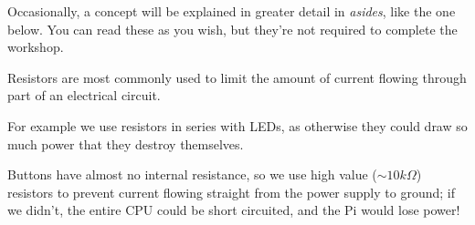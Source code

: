Occasionally, a concept will be explained in greater detail in \textit{asides}, like the one below. You can read these as you wish, but they're not required to complete the workshop.
	
\begin{aside}[Resistors]
	Resistors are most commonly used to limit the amount of current flowing through part of an electrical circuit.
	
	For example we use resistors in series with LEDs, as otherwise they could draw so much power that they destroy themselves.
	
	Buttons have almost no internal resistance, so we use high value ($\sim 10  k\Omega$) resistors to prevent current flowing straight from the power supply to ground; if we didn't, the entire CPU could be short circuited, and the Pi would lose power!
\end{aside}